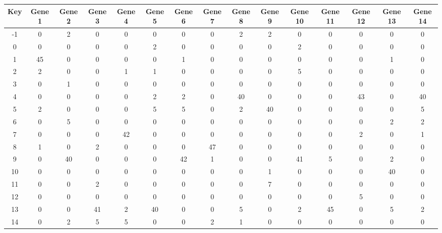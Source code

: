 \begin{tabular}{|c|c|c|c|c|c|c|c|c|c|c|c|c|c|c|}
\hline
Key & Gene 1 & Gene 2 & Gene 3 & Gene 4 & Gene 5 & Gene 6 & Gene 7 & Gene 8 & Gene 9 & Gene 10 & Gene 11 & Gene 12 & Gene 13 & Gene 14 \\
\hline
-1 & 0 & 2 & 0 & 0 & 0 & 0 & 0 & 2 & 2 & 0 & 0 & 0 & 0 & 0 \\
0 & 0 & 0 & 0 & 0 & 2 & 0 & 0 & 0 & 0 & 2 & 0 & 0 & 0 & 0 \\
1 & 45 & 0 & 0 & 0 & 0 & 1 & 0 & 0 & 0 & 0 & 0 & 0 & 1 & 0 \\
2 & 2 & 0 & 0 & 1 & 1 & 0 & 0 & 0 & 0 & 5 & 0 & 0 & 0 & 0 \\
3 & 0 & 1 & 0 & 0 & 0 & 0 & 0 & 0 & 0 & 0 & 0 & 0 & 0 & 0 \\
4 & 0 & 0 & 0 & 0 & 2 & 2 & 0 & 40 & 0 & 0 & 0 & 43 & 0 & 40 \\
5 & 2 & 0 & 0 & 0 & 5 & 5 & 0 & 2 & 40 & 0 & 0 & 0 & 0 & 5 \\
6 & 0 & 5 & 0 & 0 & 0 & 0 & 0 & 0 & 0 & 0 & 0 & 0 & 2 & 2 \\
7 & 0 & 0 & 0 & 42 & 0 & 0 & 0 & 0 & 0 & 0 & 0 & 2 & 0 & 1 \\
8 & 1 & 0 & 2 & 0 & 0 & 0 & 47 & 0 & 0 & 0 & 0 & 0 & 0 & 0 \\
9 & 0 & 40 & 0 & 0 & 0 & 42 & 1 & 0 & 0 & 41 & 5 & 0 & 2 & 0 \\
10 & 0 & 0 & 0 & 0 & 0 & 0 & 0 & 0 & 1 & 0 & 0 & 0 & 40 & 0 \\
11 & 0 & 0 & 2 & 0 & 0 & 0 & 0 & 0 & 7 & 0 & 0 & 0 & 0 & 0 \\
12 & 0 & 0 & 0 & 0 & 0 & 0 & 0 & 0 & 0 & 0 & 0 & 5 & 0 & 0 \\
13 & 0 & 0 & 41 & 2 & 40 & 0 & 0 & 5 & 0 & 2 & 45 & 0 & 5 & 2 \\
14 & 0 & 2 & 5 & 5 & 0 & 0 & 2 & 1 & 0 & 0 & 0 & 0 & 0 & 0 \\
\hline
\end{tabular}
